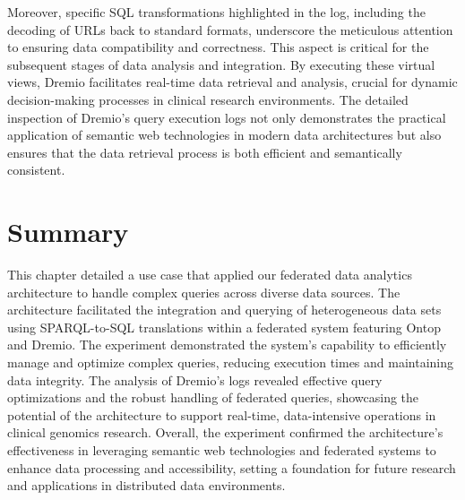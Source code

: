 Moreover, specific \ac{SQL} transformations highlighted in the log, including the decoding of URLs back to standard formats, underscore the meticulous attention to ensuring data compatibility and correctness. This aspect is critical for the subsequent stages of data analysis and integration.
By executing these virtual views, Dremio facilitates real-time data retrieval and analysis, crucial for dynamic decision-making processes in clinical research environments. The detailed inspection of Dremio's query execution logs not only demonstrates the practical application of semantic web technologies in modern data architectures but also ensures that the data retrieval process is both efficient and semantically consistent.

\section{Summary}
This chapter detailed a use case that applied our federated data analytics architecture to handle complex queries across diverse data sources. The architecture facilitated the integration and querying of heterogeneous data sets using \ac{SPARQL}-to-SQL translations within a federated system featuring Ontop and Dremio.
The experiment demonstrated the system's capability to efficiently manage and optimize complex queries, reducing execution times and maintaining data integrity. The analysis of Dremio's logs revealed effective query optimizations and the robust handling of federated queries, showcasing the potential of the architecture to support real-time, data-intensive operations in clinical genomics research.
Overall, the experiment confirmed the architecture's effectiveness in leveraging semantic web technologies and federated systems to enhance data processing and accessibility, setting a foundation for future research and applications in distributed data environments.